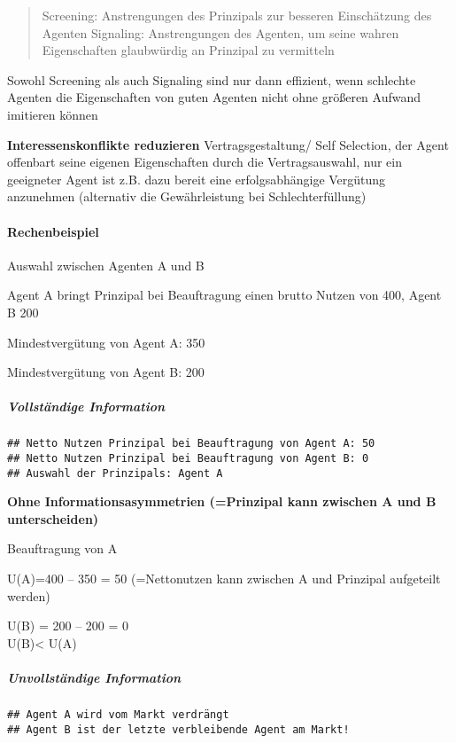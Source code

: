 \documentclass[
]{article}
\begin{document}
\begin{quote}
Screening: Anstrengungen des Prinzipals zur besseren Einschätzung des
Agenten Signaling: Anstrengungen des Agenten, um seine wahren
Eigenschaften glaubwürdig an Prinzipal zu vermitteln
\end{quote}

Sowohl Screening als auch Signaling sind nur dann effizient, wenn
schlechte Agenten die Eigenschaften von guten Agenten nicht ohne
größeren Aufwand imitieren können

\textbf{Interessenskonflikte reduzieren} Vertragsgestaltung/ Self
Selection, der Agent offenbart seine eigenen Eigenschaften durch die
Vertragsauswahl, nur ein geeigneter Agent ist z.B. dazu bereit eine
erfolgsabhängige Vergütung anzunehmen (alternativ die Gewährleistung bei
Schlechterfüllung)

\hypertarget{rechenbeispiel}{%
\paragraph{Rechenbeispiel}\label{rechenbeispiel}}

Auswahl zwischen Agenten A und B

Agent A bringt Prinzipal bei Beauftragung einen brutto Nutzen von 400,
Agent B 200

Mindestvergütung von Agent A: 350

Mindestvergütung von Agent B: 200

\hypertarget{vollstuxe4ndige-information}{%
\subparagraph{Vollständige
Information}\label{vollstuxe4ndige-information}}

\begin{verbatim}
## Netto Nutzen Prinzipal bei Beauftragung von Agent A: 50
## Netto Nutzen Prinzipal bei Beauftragung von Agent B: 0
## Auswahl der Prinzipals: Agent A
\end{verbatim}

\textbf{Ohne Informationsasymmetrien (=Prinzipal kann zwischen A und B
unterscheiden)}

Beauftragung von A

U(A)=400 -- 350 = 50 (=Nettonutzen kann zwischen A und Prinzipal
aufgeteilt werden)

U(B) = 200 -- 200 = 0\\
U(B)\textless{} U(A)

\hypertarget{unvollstuxe4ndige-information}{%
\subparagraph{Unvollständige
Information}\label{unvollstuxe4ndige-information}}

\begin{verbatim}
## Agent A wird vom Markt verdrängt
## Agent B ist der letzte verbleibende Agent am Markt!
\end{verbatim}
\end{document}

